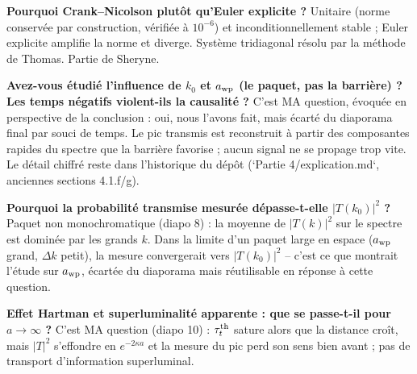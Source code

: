 \documentclass[11pt,a4paper]{article}
\begin{document}
\textbf{Pourquoi Crank--Nicolson plutôt qu'Euler explicite ?}
Unitaire (norme conservée par construction, vérifiée à $10^{-6}$) et
inconditionnellement stable ; Euler explicite amplifie la norme et diverge.
Système tridiagonal résolu par la méthode de Thomas. Partie de Sheryne.

\textbf{Avez-vous étudié l'influence de $k_0$ et $a_{\rm wp}$ (le paquet, pas la
barrière) ? Les temps négatifs violent-ils la causalité ?}
C'est MA question, évoquée en perspective de la conclusion : oui, nous l'avons
fait, mais écarté du diaporama final par souci de temps. Le pic transmis est
reconstruit à partir des composantes rapides du spectre que la barrière
favorise ; aucun signal ne se propage trop vite. Le détail chiffré reste dans
l'historique du dépôt (`Partie 4/explication.md`, anciennes sections 4.1.f/g).

\textbf{Pourquoi la probabilité transmise mesurée dépasse-t-elle $|T(k_0)|^2$ ?}
Paquet non monochromatique (diapo 8) : la moyenne de $|T(k)|^2$ sur le spectre
est dominée par les grands $k$. Dans la limite d'un paquet large en espace
($a_{\rm wp}$ grand, $\Delta k$ petit), la mesure convergerait vers
$|T(k_0)|^2$ -- c'est ce que montrait l'étude sur $a_{\rm wp}$, écartée du
diaporama mais réutilisable en réponse à cette question.

\textbf{Effet Hartman et superluminalité apparente : que se passe-t-il pour
$a \to \infty$ ?}
C'est MA question (diapo 10) : $\tau_t^{\rm th}$ sature alors que la distance
croît, mais $|T|^2$ s'effondre en $e^{-2\kappa a}$ et la mesure du pic perd son
sens bien avant ; pas de transport d'information superluminal.
\end{document}
